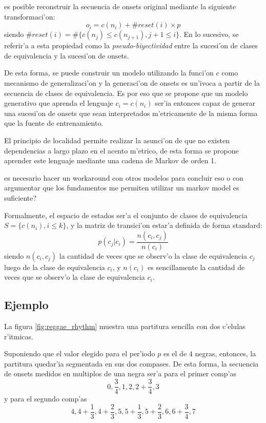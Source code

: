 es posible reconstruir la secuencia de onsets original mediante la siguiente transformaci'on:
$$o_i=c(n_i) + \#reset(i)\times p$$ siendo $\#reset(i)=\#\{c(n_j) \leq c(n_{j+1}), j+1 \leq i\}$. En lo sucesivo, se referir'a a esta propiedad como la \emph{pseudo-biyectividad} 
entre la sucesi'on de clases de equivalencia y la sucesi'on de onsets.

De esta forma, se puede construir un modelo utilizando la funci'on $c$ como mecanismo de generalizaci'on y la generaci'on de onsets es un'ivoca a partir de la secuencia de 
clases de equivalencia. Es por eso que se propone que un modelo generativo que aprenda el lenguaje $c_i=c(n_i)$ ser'ia entonces capaz de generar una sucesi'on de onsets 
que sean interpretados m'etricamente de la misma forma que la fuente de entrenamiento. 

El principio de localidad permite realizar la asunci'on de que no existen dependencias a largo plazo en el acento m'etrico, de esta forma se propone aprender este lenguaje mediante
una cadena de Markov de orden 1. 

\alert{es necesario hacer un workaround con otros modelos para concluir eso o con argumentar que los fundamentos me permiten utilizar un markov model es suficiente?}

Formalmente, el espacio de estados ser'a el conjunto de clases de equivalencia $S=\{c(n_i), i\leq k \}$, y la matriz de transici'on estar'a definida de forma standard:
$$p(c_j|c_i) = \frac{n(c_i, c_j)}{n(c_i)}$$
siendo $n(c_i, c_j)$ la cantidad de veces que se observ'o la clase de equivalencia $c_j$ luego de la clase de equivalencia $c_i$, y $n(c_i)$ es sencillamente la cantidad de 
veces que se observ'o la clase de equivalencia $c_i$.

\subsection{Ejemplo}
La figura \ref{fig:reggae_rhythm}  muestra una partitura sencilla con dos c'elulas r'itmicas.
\begin{imagen}
\end{imagen}

Suponiendo que el valor elegido para el per'iodo $p$ es el de $4$ negras, entonces, la partitura quedar'ia segmentada en sus dos compases. 
De esta forma, la secuencia de onsets medidos en multiplos de una negra ser'a para el primer comp'as
$$0, \frac{3}{4}, 1, 2, 2+\frac{3}{4}, 3$$
y para el segundo comp'as 
$$4, 4+\frac{1}{3}, 4+\frac{2}{3}, 5, 5+\frac{1}{3}, 5+\frac{2}{3}, 6, 6+\frac{3}{4}, 7$$

